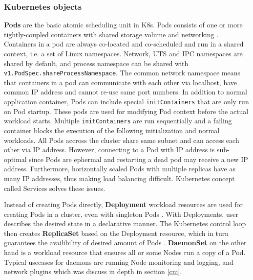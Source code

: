\documentclass[english, 12pt, a4paper, sci, utf8, a-2b, online]{aaltothesis}
\begin{document}
\subsubsection{Kubernetes objects}

\textbf{Pods} are the basic atomic scheduling unit in K8s. Pods consists of one or more tightly-coupled containers with shared storage volume and networking \cite{k8s-docs-pods}. Containers in a pod are always co-located and co-scheduled and run in a shared context, i.e. a set of Linux namespaces. Network, UTS and IPC namespaces are shared by default, and process namespace can be shared with \texttt{v1.PodSpec.shareProcessNamespace}. The common network namespace means that containers in a pod can communicate with each other via localhost, have common IP address and cannot re-use same port numbers. In addition to normal application container, Pods can include special \texttt{initContainers} that are only run on Pod startup. These pods are used for modifying Pod context before the actual workload starts. Multiple \texttt{initContainers} are run sequentially and a failing container blocks the execution of the following initialization and normal workloads. All Pods accross the cluster share same subnet and can access each other via IP address. However, connecting to a Pod with IP address is sub-optimal since Pods are ephermal and restarting a dead pod may receive a new IP address. Furthermore, horizontally scaled Pods with multiple replicas have as many IP addresses, thus making load balancing difficult. Kubernetes concept called Services solves these issues.

Instead of creating Pods directly, \textbf{Deployment} workload resources are used for creating Pods in a cluster, even with singleton Pods \cite{k8s-docs-pods}. With Deployments, user describes the desired state in a declarative manner. The Kubernetes control loop then creates \textbf{ReplicaSet} based on the Deployment resource, which in turn guarantees the availibility of desired amount of Pods \cite{k8s-docs-deployment}. \textbf{DaemonSet} on the other hand is a workload resource that ensures all or some Nodes run a copy of a Pod. Typical usecases for daemons are running Node monitoring and logging, and network plugins which was discuss in depth in section \ref{cni}.
\end{document}

